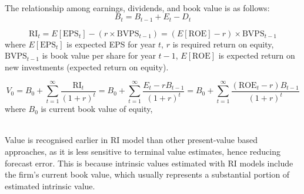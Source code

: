 \begin{definition}  \\
The relationship among earnings, dividends, and book value is as follows:
\begin{equation}
B_t = B_{t-1} + E_t - D_t \nonumber
\end{equation}
\end{definition}

\begin{method} 
\begin{equation}
\text{RI}_t = E[\text{EPS}_t] - (r \times \text{BVPS}_{t-1}) = (E[\text{ROE}] - r) \times \text{BVPS}_{t-1} \nonumber
\end{equation}
where $E[\text{EPS}_t]$ is expected EPS for year $t$, $r$ is required return on equity, $\text{BVPS}_{t-1}$ is book value per share for year $t-1$, $E[\text{ROE}]$ is expected return on new investments (expected return on equity).
\end{method}

\begin{method} 
\begin{equation}
V_0 = B_0 + \sum\limits_{t=1}^{\infty} \frac{\text{RI}_t}{(1+r)^t} = B_0 + \sum\limits_{t=1}^{\infty} \frac{E_t - r B_{t-1}}{(1+r)^t} = B_0 + \sum\limits_{t=1}^{\infty} \frac{(\text{ROE}_t - r) B_{t-1}}{(1+r)^t} \nonumber
\end{equation}
where $B_0$ is current book value of equity,
\end{method}

\begin{remark} \\
Value is recognised earlier in RI model than other present-value based approaches, as it is less sensitive to terminal value estimates, hence reducing forecast error. This is because intrinsic values estimated with RI models include the firm's current book value, which usually represents a substantial portion of estimated intrinsic value.
\end{remark}

